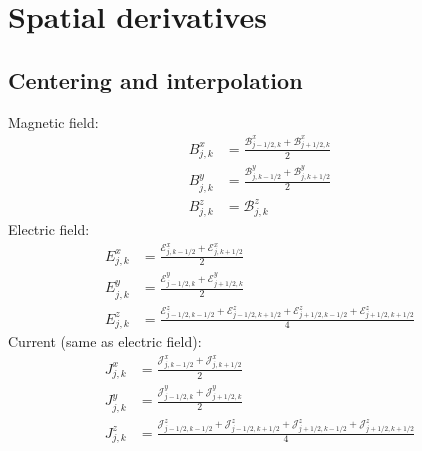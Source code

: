 \documentclass{article}
\begin{document}
\section{Spatial derivatives}

\subsection{Centering and interpolation}

Magnetic field:
\begin{align}
  B^x_{j,k} &= \frac{\mathcal{B}^x_{j-1/2,k} + \mathcal{B}^x_{j+1/2,k}}{2} \\
  B^y_{j,k} &= \frac{\mathcal{B}^y_{j,k-1/2} + \mathcal{B}^y_{j,k+1/2}}{2} \\
  B^z_{j,k} &= \mathcal{B}^z_{j,k}
\end{align}
Electric field:
\begin{align}
  E^x_{j,k} &= \frac{\mathcal{E}^x_{j,k-1/2} + \mathcal{E}^x_{j,k+1/2}}{2} \\
  E^y_{j,k} &= \frac{\mathcal{E}^y_{j-1/2,k} + \mathcal{E}^y_{j+1/2,k}}{2} \\
  E^z_{j,k} &= \frac{\mathcal{E}^z_{j-1/2,k-1/2}
                   + \mathcal{E}^z_{j-1/2,k+1/2}
                   + \mathcal{E}^z_{j+1/2,k-1/2}
                   + \mathcal{E}^z_{j+1/2,k+1/2}}{4}
\end{align}
Current (same as electric field):
\begin{align}
  J^x_{j,k} &= \frac{\mathcal{J}^x_{j,k-1/2} + \mathcal{J}^x_{j,k+1/2}}{2} \\
  J^y_{j,k} &= \frac{\mathcal{J}^y_{j-1/2,k} + \mathcal{J}^y_{j+1/2,k}}{2} \\
  J^z_{j,k} &= \frac{\mathcal{J}^z_{j-1/2,k-1/2}
                   + \mathcal{J}^z_{j-1/2,k+1/2}
                   + \mathcal{J}^z_{j+1/2,k-1/2}
                   + \mathcal{J}^z_{j+1/2,k+1/2}}{4}
\end{align}
\end{document}
